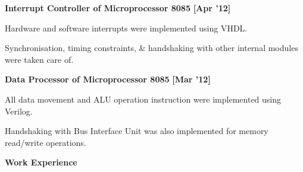 \documentclass[a4paper,10pt]{article}
\begin{document}
\begin{itemize*}
  \setlength{\itemsep}{1pt}
  \item \textbf{\small{Interrupt Controller of Microprocessor 8085}} \hfill {\small{{\textbf{[Apr '12]}}}\/}
  \begin{itemize*}
    \item Hardware and software interrupts were implemented using VHDL.
    \item Synchronisation, timing constraints,
    \& handshaking with other internal modules were taken care of.
  \end{itemize*}
\end{itemize*}

\begin{itemize*}
  \setlength{\itemsep}{1pt}
  \item \textbf{\small{Data Processor of Microprocessor 8085}} \hfill {\small{{\textbf{[Mar '12]}}}\/}
  \begin{itemize*}
    \item All data movement and ALU operation instruction were implemented using Verilog.
    \item Handshaking with Bus Interface Unit was also implemented for memory read/write operations.
  \end{itemize*}
\end{itemize*}

\colorbox{titleColor}{\parbox{6.7in}{\textbf{Work Experience}}}
\end{document}
